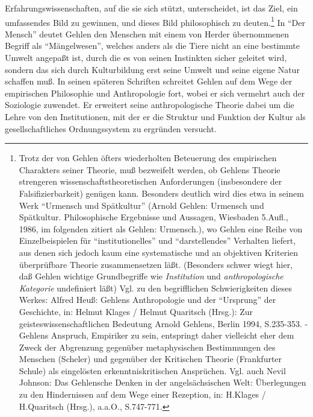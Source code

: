 \documentclass[12pt,a4paper]{article}
\begin{document}
Erfahrungswissenschaften, auf die sie sich stützt, unterscheidet, ist
das Ziel, ein umfassendes Bild zu gewinnen, und dieses Bild
philosophisch zu deuten.\footnote{Trotz der von Gehlen öfters
  wiederholten Beteuerung des empirischen Charakters seiner Theorie, muß
  bezweifelt werden, ob Gehlens Theorie strengeren
  wissenschaftstheoretischen Anforderungen (insbesondere der
  Falsifizierbarkeit) genügen kann. Besonders deutlich wird dies etwa in
  seinem Werk "`Urmensch und Spätkultur"' (Arnold Gehlen: Urmensch und
  Spätkultur. Philosophische Ergebnisse und Aussagen, Wiesbaden 5.Aufl.,
  1986, im folgenden zitiert als Gehlen: Urmensch.), wo Gehlen eine
  Reihe von Einzelbeispielen für "`institutionelles"' und
  "`darstellendes"' Verhalten liefert, aus denen sich jedoch kaum eine
  systematische und an objektiven Kriterien überprüfbare Theorie
  zusammensetzen läßt. (Besonders schwer wiegt hier, daß Gehlen wichtige
  Grundbegriffe wie {\em Institution} und {\em anthropologische
    Kategorie} undefiniert läßt) Vgl. zu den begrifflichen
  Schwierigkeiten dieses Werkes: Alfred Heuß: Gehlens Anthropologie und
  der "`Ursprung"' der Geschichte, in: Helmut Klages / Helmut Quaritsch
  (Hrsg.): Zur geisteswissenschaftlichen Bedeutung Arnold Gehlens,
  Berlin 1994, S.235-353. - Gehlens Anspruch, Empiriker zu sein,
  entspringt daher vielleicht eher dem Zweck der Abgrenzung gegenüber
  metaphysischen Bestimmungen des Menschen (Scheler) und gegenüber der
  Kritischen Theorie (Frankfurter Schule) als eingelösten
  erkenntniskritischen Ansprüchen.  Vgl.  auch Nevil Johnson: Das
  Gehlensche Denken in der angelsächsischen Welt: Überlegungen zu den
  Hindernissen auf dem Wege einer Rezeption, in: H.Klages / H.Quaritsch
  (Hrsg.), a.a.O., S.747-771.} In "`Der Mensch"' deutet Gehlen den
Menschen mit einem von Herder übernommenen Begriff als "`Mängelwesen"',
welches anders als die Tiere nicht an eine bestimmte Umwelt angepaßt
ist, durch die es von seinen Instinkten sicher geleitet wird, sondern
das sich durch Kulturbildung erst seine Umwelt und seine eigene Natur
schaffen muß. In seinen späteren Schriften schreitet Gehlen auf dem Wege
der empirischen Philosophie und Anthropologie fort, wobei er sich
vermehrt auch der Soziologie zuwendet. Er erweitert seine
anthropologische Theorie dabei um die Lehre von den Institutionen, mit
der er die Struktur und Funktion der Kultur als gesellschaftliches
Ordnungssystem zu ergründen versucht.
\end{document}
